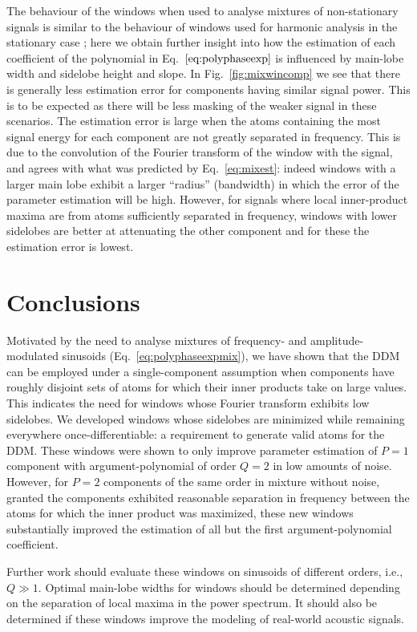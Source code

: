 \documentclass[twoside,a4paper]{article}
\begin{document}
The behaviour of the windows when used to analyse mixtures of non-stationary
signals is similar to the behaviour of windows used for harmonic analysis in the
stationary case \cite{harris1978use}; here we obtain further insight into how
the estimation of each coefficient of the polynomial in
Eq.~$\ref{eq:polyphaseexp}$ is influenced by main-lobe width and sidelobe
height and slope. In Fig.~\ref{fig:mixwincomp} we see that there is generally less
estimation error for components having similar signal power. This is to be
expected as there will be less masking of the weaker signal in these scenarios.
The estimation error is large when the atoms containing the most signal energy
for each component are not greatly separated in frequency.  This is due to the
convolution of the Fourier transform of the window with the signal, and agrees
with what was predicted by Eq.~\ref{eq:mixest}: indeed windows with a larger
main lobe exhibit a larger ``radius'' (bandwidth) in which the error of the
parameter estimation will be high.  However, for signals where local
inner-product maxima are from atoms sufficiently separated in frequency, windows
with lower sidelobes are better at attenuating the other component and for these
the estimation error is lowest.

\section{Conclusions}

Motivated by the need to analyse mixtures of frequency- and
am\-pli\-tude-mod\-u\-lat\-ed
sinusoids (Eq.~\ref{eq:polyphaseexpmix}), we have shown that the DDM can be
employed under a single-component
assumption when components have roughly disjoint sets of atoms for which their
inner products take on large values. This indicates the need for windows whose
Fourier transform exhibits low sidelobes. We developed windows whose sidelobes
are minimized while remaining everywhere once-differentiable: a requirement to
generate valid atoms for the DDM. These windows were shown to only improve parameter
estimation of $P=1$ component with argument-polynomial of order $Q=2$ in low
amounts of noise. However, for $P=2$ components of the same order in mixture without
noise, granted the components
exhibited reasonable separation in frequency between the atoms for which the
inner product was maximized, these new windows substantially improved the
estimation of all but the first argument-polynomial coefficient.

Further work should evaluate these windows on sinusoids of different orders,
i.e., $Q \gg 1$. Optimal main-lobe widths for windows should be determined
depending on the separation of local maxima in the power spectrum. It should
also be determined if these windows improve the modeling of real-world acoustic
signals.
\end{document}
